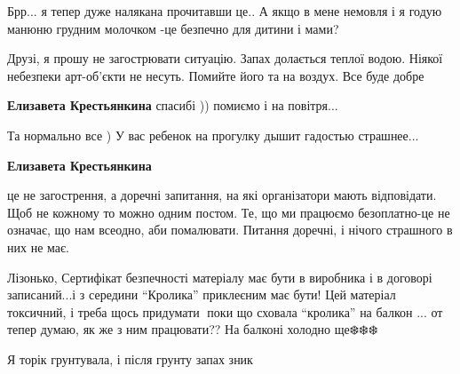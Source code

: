 
Брр... я тепер дуже налякана прочитавши це.. А якщо в мене немовля і я годую
манюню грудним молочком -це безпечно для дитини і мами?

\begin{itemize} %

Друзі, я прошу не загострювати ситуацію. Запах долається теплої водою. Ніякої
небезпеки арт-об'єкти не несуть. Помийте його та на воздух. Все буде добре

\textbf{Елизавета Крестьянкина} спасибі )) помиємо і на повітря...


Та нормально все ) У вас ребенок на прогулку дышит гадостью страшнее...

\textbf{Елизавета Крестьянкина} 

це не загострення, а доречні запитання, на які організатори мають відповідати.
Щоб не кожному то можно одним постом. Те, що ми працюємо безоплатно-це не
означає, що нам всеодно, аби помалювати. Питання доречні, і нічого страшного в
них не має.

\end{itemize} %


Лізонько, Сертифікат безпечності матеріалу має бути в виробника і в договорі
записаний...і з середини \enquote{Кролика} приклеєним має бути! Цей матеріал
токсичний, і треба щось придумати🐰 поки що сховала \enquote{кролика} на балкон ... от
тепер думаю, як же з ним працювати?? На балконі холодно ще❄️❄️❄️


Я торік грунтувала, і після грунту запах зник

